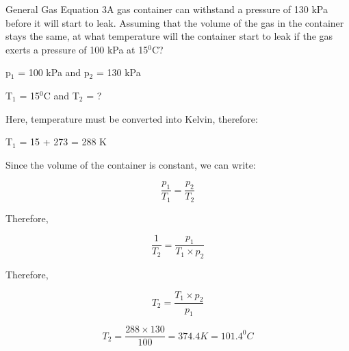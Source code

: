 \begin{wex}{General Gas Equation 3}{A gas container can withstand a pressure of 130 kPa before it will start to leak. Assuming that the volume of the gas in the container stays the same, at what temperature will the container start to leak if the gas exerts a pressure of 100 kPa at 15$^{0}$C?\\}

{

p$_{1}$ = 100 kPa and p$_{2}$ = 130 kPa

T$_{1}$ = 15$^{0}$C and T$_{2}$ = ?\\
}

{
Here, temperature must be converted into Kelvin, therefore:

T$_{1}$ = 15 + 273 = 288 K\\
}

{

Since the volume of the container is constant, we can write:

\begin{equation*}
\frac{p_{1}}{T_{1}} = \frac{p_{2}}{T_{2}}
\end{equation*}

Therefore,

\begin{equation*}
\frac{1}{T_{2}} = \frac{p_{1}}{T_{1} \times p_{2}}
\end{equation*}

Therefore,

\begin{equation*}
T_{2} = \frac{T_{1} \times p_{2}}{p_{1}}
\end{equation*}
}

{

\begin{equation*}
T_{2} = \frac{288 \times 130}{100} = 374.4 K = 101.4^{0}C
\end{equation*}
}
\end{wex}

